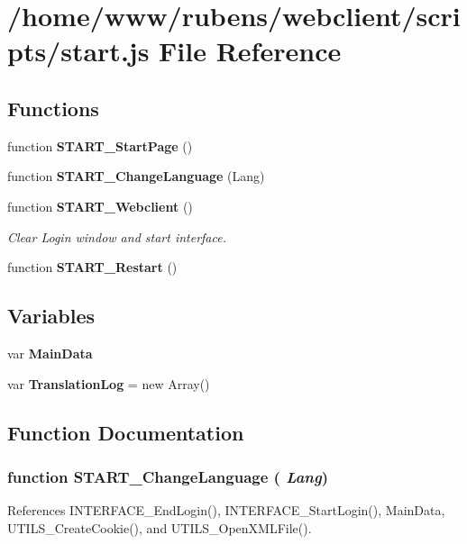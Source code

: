 \section{/home/www/rubens/webclient/scripts/start.js File Reference}
\label{start_8js}
\subsection*{Functions}
\begin{CompactItemize}
\item 
function {\bf START\_\-StartPage} ()
\item 
function {\bf START\_\-ChangeLanguage} (Lang)
\item 
function {\bf START\_\-Webclient} ()
\begin{CompactList}\small\item\em Clear Login window and start interface. \item\end{CompactList}\item 
function {\bf START\_\-Restart} ()
\end{CompactItemize}
\subsection*{Variables}
\begin{CompactItemize}
\item 
var {\bf MainData}
\item 
var {\bf TranslationLog} = new Array()
\end{CompactItemize}


\subsection{Function Documentation}
\subsubsection[START\_\-ChangeLanguage]{\setlength{\rightskip}{0pt plus 5cm}function START\_\-ChangeLanguage ( {\em Lang})}\label{start_8js_2cb0a9dca5d144d34f5f442e36bceffe}




References INTERFACE\_\-EndLogin(), INTERFACE\_\-StartLogin(), MainData, UTILS\_\-CreateCookie(), and UTILS\_\-OpenXMLFile().

